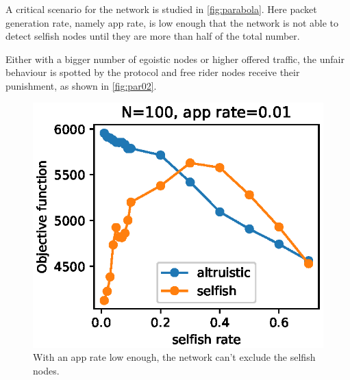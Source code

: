 \documentclass[conference,10.5pt]{IEEEtran}
\begin{document}
A critical scenario for the network is studied in \autoref{fig:parabola}. Here packet generation rate, namely app rate, is low enough that the network is not able to detect selfish nodes until they are more than half of the total number.

Either with a bigger number of egoistic nodes or higher offered traffic, the unfair behaviour is spotted by the protocol and free rider nodes receive their punishment, as shown in \autoref{fig:par02}.

\begin{figure}[h]
  \includegraphics{figures/obj_func_vs_selfish_rate_parabola.eps}
  \caption{With an app rate low enough, the network can't exclude the selfish nodes.}
  \label{fig:parabola}
\end{figure}
\end{document}
